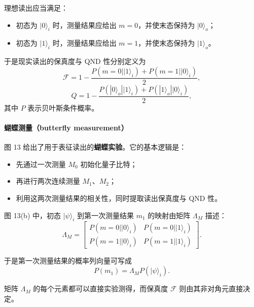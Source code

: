 \documentclass[12pt,a4paper,oneside]{ctexbook}
\begin{document}
理想读出应当满足：
\begin{itemize}
    \item 初态为 \(|0\rangle_i\) 时，测量结果应给出 \(m=0\)，并使末态保持为 \(|0\rangle_o\)；
    \item 初态为 \(|1\rangle_i\) 时，测量结果应给出 \(m=1\)，并使末态保持为 \(|1\rangle_o\)。
\end{itemize}

于是现实读出的保真度与 QND 性分别定义为
\begin{equation}
\mathcal{F}
=
1-
\frac{
P(m=0||1\rangle_i)+P(m=1||0\rangle_i)
}{2},
\tag{60}
\end{equation}
\begin{equation}
Q
=
1-
\frac{
P(|0\rangle_o||1\rangle_i)+P(|1\rangle_o||0\rangle_i)
}{2},
\tag{61}
\end{equation}
其中 \(P\) 表示贝叶斯条件概率。

\paragraph{蝴蝶测量（butterfly measurement）}
图 13 给出了用于表征读出的\textbf{蝴蝶实验}。它的基本逻辑是：
\begin{itemize}
    \item 先通过一次测量 \(M_0\) 初始化量子比特；
    \item 再进行两次连续测量 \(M_1\)、\(M_2\)；
    \item 利用这两次测量结果的相关性，同时提取读出保真度与 QND 性。
\end{itemize}

图 13(b) 中，初态 \(|\psi\rangle_i\) 到第一次测量结果 \(m_1\) 的映射由矩阵 \(\Lambda_M\) 描述：
\begin{equation}
\Lambda_M
=
\begin{bmatrix}
P(m=0||0\rangle_i) & P(m=0||1\rangle_i) \\
P(m=1||0\rangle_i) & P(m=1||1\rangle_i)
\end{bmatrix}.
\tag{62}
\end{equation}

于是第一次测量结果的概率列向量可写成
\[
P(m_1)=\Lambda_M P(|\psi\rangle_i).
\]

矩阵 \(\Lambda_M\) 的每个元素都可以直接实验测得，而保真度 \(\mathcal{F}\) 则由其非对角元直接决定。
\end{document}
